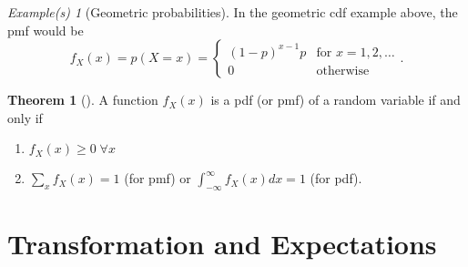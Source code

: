 \documentclass[12pt, letterpaper]{article}
\theoremstyle{definition}
\newtheorem*{thm}{Theorem}
\theoremstyle{remark}
\newtheorem*{eg}{Example(s)}
\begin{document}
\begin{eg}[Geometric probabilities]
    In the geometric cdf example above, the pmf would be
    \[f_X(x) = p(X = x) = \begin{cases}
        (1-p)^{x-1}p & \text{for } x=1,2,\ldots \\
        0 & \text{otherwise}
    \end{cases}.\]
\end{eg}

\begin{thm}[]
    A function \(f_X(x)\) is a pdf (or pmf) of a random variable if and only if
    \begin{enumerate}
        \item \(f_X(x) \geq 0 \; \forall x\)
        \item \(\sum_{x}f_X(x) = 1\) (for pmf) or \(\int_{- \infty}^{ \infty} f_X(x) dx = 1\) (for pdf).
    \end{enumerate}
    
\end{thm}


\section{Transformation and Expectations}
\end{document}
